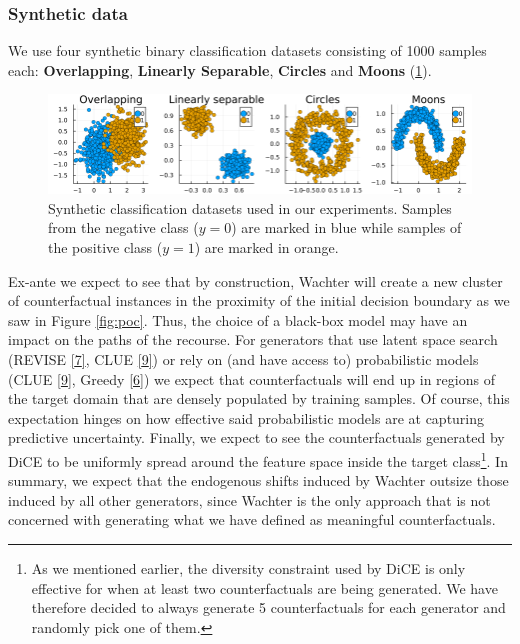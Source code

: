 \documentclass[conference,final,]{IEEEtran}
\theoremstyle{definition}
\theoremstyle{definition}
\theoremstyle{definition}
\theoremstyle{definition}
\theoremstyle{remark}
\begin{document}
\hypertarget{synthetic-data}{%
\subsubsection{Synthetic data}\label{synthetic-data}}

We use four synthetic binary classification datasets consisting of 1000 samples each: \textbf{Overlapping}, \textbf{Linearly Separable}, \textbf{Circles} and \textbf{Moons} (\ref{fig:synthetic-data}).

\begin{figure}

{\centering \includegraphics[width=0.9\linewidth]{www/synthetic_data} 

}

\caption{Synthetic classification datasets used in our experiments. Samples from the negative class ($y=0$) are marked in blue while samples of the positive class ($y=1$) are marked in orange.}\label{fig:synthetic-data}
\end{figure}

Ex-ante we expect to see that by construction, Wachter will create a new cluster of counterfactual instances in the proximity of the initial decision boundary as we saw in Figure \ref{fig:poc}. Thus, the choice of a black-box model may have an impact on the paths of the recourse. For generators that use latent space search (REVISE \protect\hyperlink{ref-joshi2019realistic}{{[}7{]}}, CLUE \protect\hyperlink{ref-antoran2020getting}{{[}9{]}}) or rely on (and have access to) probabilistic models (CLUE \protect\hyperlink{ref-antoran2020getting}{{[}9{]}}, Greedy \protect\hyperlink{ref-schut2021generating}{{[}6{]}}) we expect that counterfactuals will end up in regions of the target domain that are densely populated by training samples. Of course, this expectation hinges on how effective said probabilistic models are at capturing predictive uncertainty. Finally, we expect to see the counterfactuals generated by DiCE to be uniformly spread around the feature space inside the target class\footnote{As we mentioned earlier, the diversity constraint used by DiCE is only effective for when at least two counterfactuals are being generated. We have therefore decided to always generate 5 counterfactuals for each generator and randomly pick one of them.}. In summary, we expect that the endogenous shifts induced by Wachter outsize those induced by all other generators, since Wachter is the only approach that is not concerned with generating what we have defined as meaningful counterfactuals.
\end{document}
